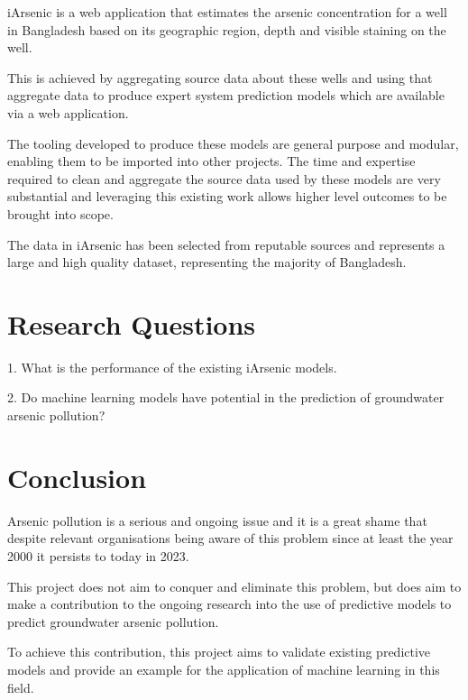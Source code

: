 iArsenic is a web application that estimates the arsenic concentration for a well in Bangladesh based on its geographic region, depth and visible staining on the well.

This is achieved by aggregating source data about these wells and using that aggregate data to produce expert system prediction models which are available via a web application.

The tooling developed to produce these models are general purpose and modular, enabling them to be imported into other projects. The time and expertise required to clean and aggregate the source data used by these models are very substantial and leveraging this existing work allows higher level outcomes to be brought into scope.

The data in iArsenic has been selected from reputable sources and represents a large and high quality dataset, representing the majority of Bangladesh.

\section{Research Questions}
\label{RQ}

1. What is the performance of the existing iArsenic models.

2. Do machine learning models have potential in the prediction of groundwater arsenic pollution?

\section{Conclusion}

Arsenic pollution is a serious and ongoing issue and it is a great shame that despite relevant organisations being aware of this problem since at least the year 2000 it persists to today in 2023.

This project does not aim to conquer and eliminate this problem, but does aim to make a contribution to the ongoing research into the use of predictive models to predict groundwater arsenic pollution.

To achieve this contribution, this project aims to validate existing predictive models and provide an example for the application of machine learning in this field.
